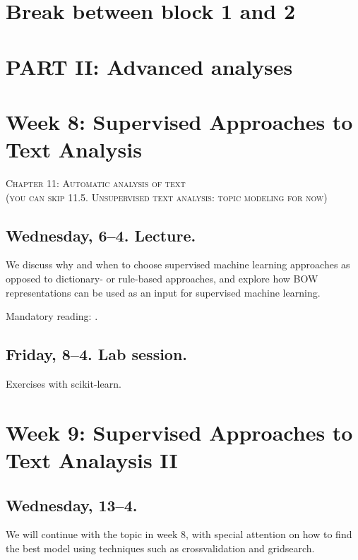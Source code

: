 \section*{Break between block 1 and 2}




\section*{PART II: Advanced analyses}


\section*{Week 8: Supervised Approaches to Text Analysis}
\textsc{ Chapter 11: Automatic analysis of text}\\
\textsc{ (you can skip 11.5. Unsupervised text analysis: topic modeling for now)}\\


\subsection*{Wednesday, 6--4. Lecture.}

We discuss why and when to choose supervised machine learning approaches as opposed to dictionary- or rule-based approaches, and explore how BOW representations can be used as an input for supervised machine learning.

Mandatory reading: \cite{Boumans2016}.

\subsection*{Friday, 8--4. Lab session.}
Exercises with scikit-learn.



\section*{Week 9: Supervised Approaches to Text Analaysis II}

\subsection*{Wednesday, 13--4.}

We will continue with the topic in week 8, with special attention on how to find the best model using techniques such as crossvalidation and gridsearch.


